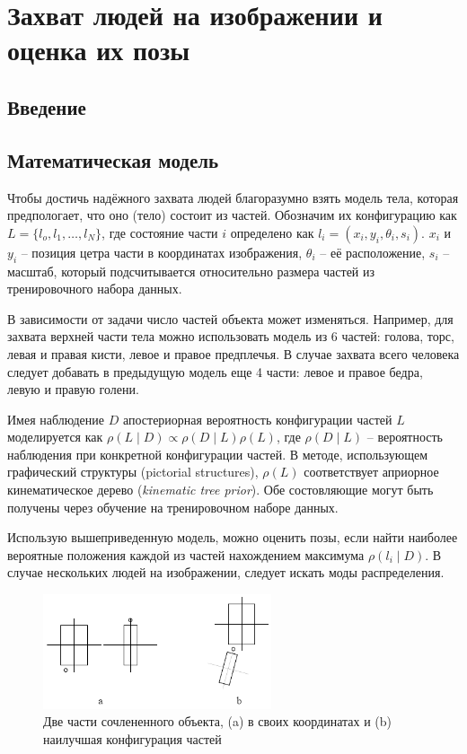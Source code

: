 \section{Захват людей на изображении и оценка их позы}

\subsection{Введение}
\subsection{Математическая модель}

Чтобы достичь надёжного захвата людей благоразумно взять модель тела, которая предпологает, что оно (тело) состоит из частей. Обозначим их конфигурацию как \(L = \{l_o, l_1, \dots, l_N\}\), где состояние части \(i\) определено как \(l_i = (x_i, y_i, \theta_i, s_i)\). \(x_i\) и \(y_i\) -- позиция цетра части в координатах изображения, \(\theta_i\) -- её расположение, \(s_i\) -- масштаб, который подсчитывается относительно размера частей из тренировочного набора данных.

В зависимости от задачи число частей объекта может изменяться. Например, для захвата верхней части тела можно использовать модель из 6 частей: голова, торс, левая и правая кисти, левое и правое предплечья. В случае захвата всего человека следует добавать в предыдущую модель еще 4 части: левое и правое бедра, левую и правую голени.

Имея наблюдение \(D\) апостериорная вероятность конфигурации частей \(L\) моделируется как \(\rho(L{\mid}D)\propto\rho(D{\mid}L)\rho(L)\), где \(\rho(D{\mid}L)\) -- вероятность наблюдения при конкретной конфигурации частей. В методе, использующем графический структуры (pictorial structures), \(\rho(L)\) соответствует априорное кинематическое дерево (\emph{kinematic tree prior}). Обе состовляющие могут быть получены через обучение на тренировочном наборе данных.

Использую вышеприведенную модель, можно оценить позы, если найти наиболее вероятные положения каждой из частей нахождением максимума \(\rho(l_i{\mid}D)\). В случае нескольких людей на изображении, следует искать моды распределения.

\begin{figure}
  \centering
  \includegraphics[width=0.6\textwidth]{images/detection-two-parts.png}
  \caption{Две части сочлененного объекта, (a) в своих координатах и (b) наилучшая конфигурация частей\label{detection-two-parts}}
\end{figure}

